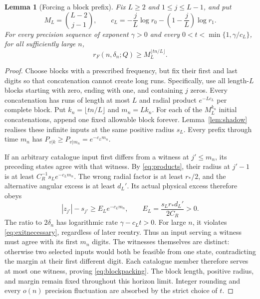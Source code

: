 \documentclass[11pt]{amsart}
\newtheorem{lemma}[theorem]{Lemma}
\theoremstyle{definition}
\theoremstyle{remark}
\numberwithin{equation}{section}
\begin{document}
\begin{lemma}[Forcing a block prefix]\label{lem:prefixpacking}
Fix $L\ge2$ and $1\le j\le L-1$, and put
\[
M_L=\binom{L-2}{j-1},\qquad
c_L=-\frac jL\log r_0-\left(1-\frac jL\right)\log r_1.
\]
For every precision sequence of exponent $\gamma>0$ and every
$0<t<\min\{1,\gamma/c_L\}$, for all sufficiently large $n$,
\begin{equation}\label{eq:blockpacking}
r_F(n,\delta_n;Q)\ge M_L^{\lfloor tn/L\rfloor}.
\end{equation}
\end{lemma}
\begin{proof}
Choose blocks with a prescribed frequency, but fix their first
and last digits so that concatenation cannot create long runs.
Specifically, use all length-$L$ blocks starting with zero, ending
with one, and containing $j$ zeros. Every concatenation has runs of length
at most $L$ and radial product $e^{-Lc_L}$ per complete block.
Put $k_n=\lfloor tn/L\rfloor$ and $m_n=Lk_n$.
For each of the $M_L^{k_n}$ initial concatenations, append one
fixed allowable block forever. Lemma~\ref{lem:shadow} realises
these infinite inputs at the same positive radius $s_L$.
Every prefix through time $m_n$ has
$P_{v|k}\ge P_{v|m_n}=e^{-c_Lm_n}$.

If an arbitrary catalogue input first differs from a witness at
$j'\le m_n$, its preceding states agree with that witness.
By \eqref{eq:products}, their radius at $j'-1$ is at least
$C_R^{-1}s_Le^{-c_Lm_n}$. The wrong radial factor is at least
$r_*/2$, and the alternative angular excess is at least $d_L'$.
Its actual physical excess therefore obeys
\begin{equation}\label{eq:physicalmargin}
|z_{j'}|-s_{j'}\ge E_Le^{-c_Lm_n},\qquad
E_L=\frac{s_Lr_*d_L'}{2C_R}>0.
\end{equation}
The ratio to $2\delta_n$ has logarithmic rate
$\gamma-c_Lt>0$. For large $n$, it violates
\eqref{eq:exitnecessary}, regardless of later reentry.
Thus an input serving a witness must agree with its first $m_n$
digits. The witnesses themselves are distinct: otherwise two
selected inputs would both be feasible from one state, contradicting
the margin at their first different digit. Each catalogue member
therefore serves at most one witness, proving \eqref{eq:blockpacking}.
The block length, positive radius, and margin remain fixed throughout
this horizon limit. Integer rounding and every $o(n)$ precision
fluctuation are absorbed by the strict choice of $t$.
\end{proof}
\end{document}
